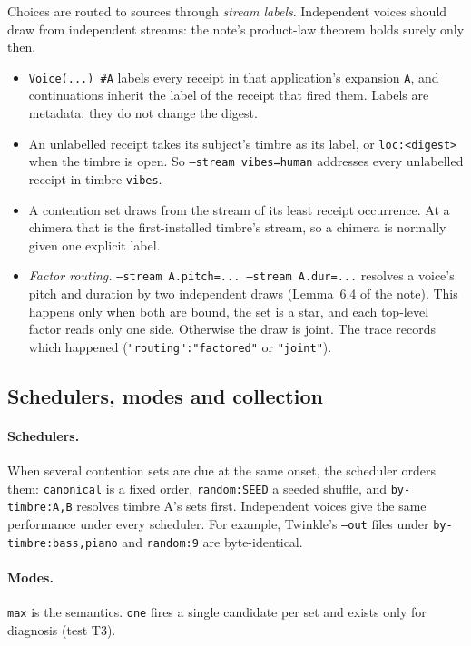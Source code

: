 \documentclass[11pt,a4paper]{article}
\newcommand{\ttx}[1]{\texttt{#1}}
\begin{document}
Choices are routed to sources through \emph{stream labels}. Independent voices
should draw from independent streams: the note's product-law theorem holds
surely only then.
\begin{itemize}
\item \ttx{Voice(...) \#A} labels every receipt in that application's expansion
  \ttx{A}, and continuations inherit the label of the receipt that fired them.
  Labels are metadata: they do not change the digest.
\item An unlabelled receipt takes its subject's timbre as its label, or
  \ttx{loc:<digest>} when the timbre is open. So \ttx{--stream vibes=human}
  addresses every unlabelled receipt in timbre \ttx{vibes}.
\item A contention set draws from the stream of its least receipt occurrence.
  At a chimera that is the first-installed timbre's stream, so a chimera is
  normally given one explicit label.
\item \emph{Factor routing.} \ttx{--stream A.pitch=... --stream A.dur=...}
  resolves a voice's pitch and duration by two independent draws (Lemma~6.4 of
  the note). This happens only when both are bound, the set is a star, and each
  top-level factor reads only one side. Otherwise the draw is joint. The trace
  records which happened (\ttx{"routing":"factored"} or \ttx{"joint"}).
\end{itemize}

\subsection{Schedulers, modes and collection}

\paragraph{Schedulers.} When several contention sets are due at the same
onset, the scheduler orders them: \ttx{canonical} is a fixed order,
\ttx{random:SEED} a seeded shuffle, and \ttx{by-timbre:A,B} resolves timbre A's
sets first. Independent voices give the same performance under every
scheduler. For example, Twinkle's \ttx{--out} files under
\ttx{by-timbre:bass,piano} and \ttx{random:9} are byte-identical.

\paragraph{Modes.} \ttx{max} is the semantics. \ttx{one} fires a single
candidate per set and exists only for diagnosis (test T3).
\end{document}
